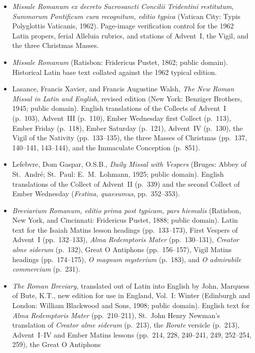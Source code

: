 \begin{itemize}
\item \textit{Missale Romanum ex decreto Sacrosancti Concilii Tridentini
restitutum, Summorum Pontificum cura recognitum, editio typica} (Vatican City:
Typis Polyglottis Vaticanis, 1962). Page-image verification control for the
1962 Latin propers, ferial Alleluia rubrics, and stations of Advent~I, the
Vigil, and the three Christmas Masses.
\item \textit{Missale Romanum} (Ratisbon: Fridericus Pustet, 1862; public
domain). Historical Latin base text collated against the 1962 typical edition.
\item Lasance, Francis Xavier, and Francis Augustine Walsh, \textit{The New
Roman Missal in Latin and English}, revised edition (New York: Benziger
Brothers, 1945; public domain). English translations of the Collects of
Advent~I (p.~103), Advent~III (p.~110), Ember Wednesday first Collect (p.~113),
Ember Friday (p.~118), Ember Saturday (p.~121), Advent~IV (p.~130), the Vigil
of the Nativity (pp.~133--135), the three Masses of Christmas (pp.~137,
140--141, 143--144), and the Immaculate Conception (p.~851).
\item Lefebvre, Dom Gaspar, O.S.B., \textit{Daily Missal with Vespers} (Bruges:
Abbey of St.~Andr\'e; St.~Paul: E.~M.~Lohmann, 1925; public domain). English
translations of the Collect of Advent~II (p.~339) and the second Collect of
Ember Wednesday (\textit{Festina, quaesumus}, pp.~352--353).
\item \textit{Breviarium Romanum, editio prima post typicam, pars hiemalis}
(Ratisbon, New York, and Cincinnati: Fridericus Pustet, 1888; public domain).
Latin text for the Isaiah Matins lesson headings (pp.~133--173), First
Vespers of Advent~I (pp.~132--133), \textit{Alma Redemptoris Mater}
(pp.~130--131), \textit{Creator alme siderum} (p.~132), Great O Antiphons
(pp.~156--157), Vigil Matins headings (pp.~174--175), \textit{O magnum
mysterium} (p.~183), and \textit{O admirabile commercium} (p.~231).
\item \textit{The Roman Breviary}, translated out of Latin into English by John,
Marquess of Bute, K.T., new edition for use in England, Vol.~I: Winter
(Edinburgh and London: William Blackwood and Sons, 1908; public domain).
English text for \textit{Alma Redemptoris Mater} (pp.~210--211), St.~John
Henry Newman's translation of \textit{Creator alme siderum} (p.~213), the
\textit{Rorate} versicle (p.~213), Advent~I--IV and Ember Matins lessons
(pp.~214, 228, 240--241, 249, 252--254, 259), the Great O Antiphons

\end{itemize}
